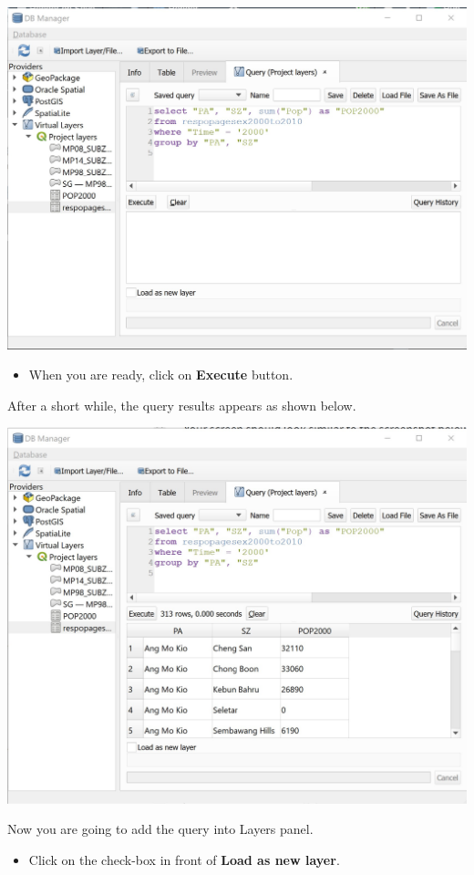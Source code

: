 \documentclass[
  letterpaper,
  DIV=11,
  numbers=noendperiod]{scrreprt}
\providecommand{\tightlist}{%
  \setlength{\itemsep}{0pt}\setlength{\parskip}{0pt}}\usepackage{longtable,booktabs,array}
\begin{document}
\includegraphics{./img03/image46.jpg}

\begin{itemize}
\tightlist
\item
  When you are ready, click on \textbf{Execute} button.
\end{itemize}

After a short while, the query results appears as shown below.

\includegraphics{./img03/image47.jpg}

Now you are going to add the query into Layers panel.

\begin{itemize}
\tightlist
\item
  Click on the check-box in front of \textbf{Load as new layer}.
\end{itemize}
\end{document}
